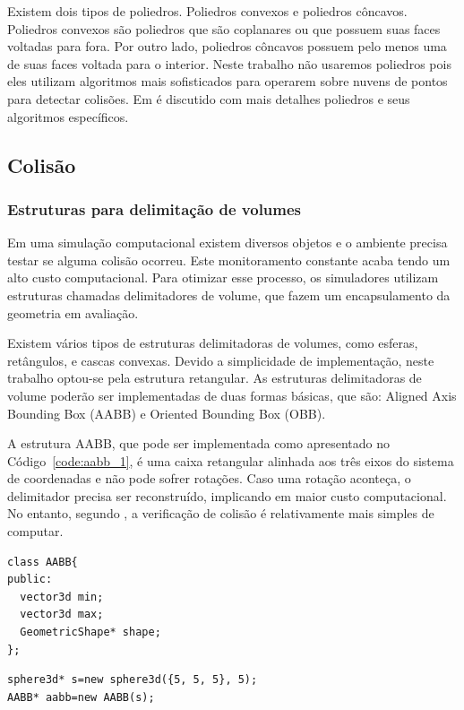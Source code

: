 Existem dois tipos de poliedros. Poliedros convexos e poliedros
côncavos. Poliedros convexos são poliedros que são coplanares ou que possuem
suas faces voltadas para fora. Por outro lado, poliedros côncavos possuem
pelo menos uma de suas faces voltada para o interior.
Neste trabalho não usaremos poliedros pois eles utilizam algoritmos mais
sofisticados para operarem sobre nuvens de pontos para detectar colisões.
Em  é discutido com mais detalhes poliedros e seus algoritmos específicos.

\subsection{Colisão}
\subsubsection{Estruturas para delimitação de volumes}

Em uma simulação computacional existem diversos objetos e o ambiente precisa testar se alguma colisão ocorreu. Este monitoramento constante acaba tendo um alto custo computacional. Para otimizar esse processo, os simuladores utilizam estruturas chamadas delimitadores de volume, que fazem um encapsulamento da geometria em avaliação.

Existem vários tipos de estruturas delimitadoras de volumes, como esferas, retângulos, e cascas convexas. Devido a simplicidade de implementação, neste trabalho optou-se pela estrutura retangular. As estruturas delimitadoras de volume poderão ser implementadas de duas formas básicas, que são: Aligned Axis Bounding Box (AABB) e Oriented Bounding Box (OBB).

A estrutura AABB, que pode ser implementada como apresentado no Código~\ref{code:aabb_1}, é uma caixa retangular alinhada aos três eixos do sistema de coordenadas e não pode sofrer rotações. Caso uma rotação aconteça, o delimitador precisa ser reconstruído, implicando em maior custo computacional. No entanto, segundo , a verificação de colisão é relativamente mais simples de computar.

\begin{lstlisting}[frame=single,caption=Exemplo de AABB\label{code:aabb_1}]
class AABB{
public:
  vector3d min;
  vector3d max;
  GeometricShape* shape;
};
\end{lstlisting}

\begin{lstlisting}[frame=single,caption=Exemplo de AABB e Esfera\label{code:aabbSphere}]
sphere3d* s=new sphere3d({5, 5, 5}, 5);
AABB* aabb=new AABB(s);
\end{lstlisting}



